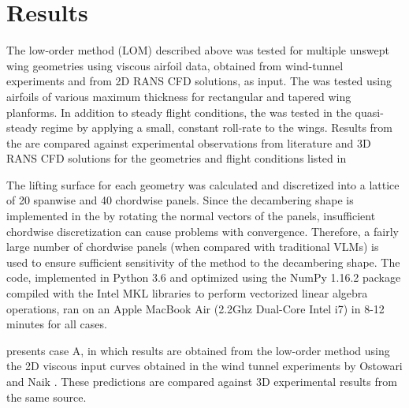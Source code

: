 \section{Results}
\label{sec:unswept-results}

The low-order method (LOM) described above was tested for multiple unswept wing geometries using viscous airfoil data, obtained from wind-tunnel experiments and from 2D RANS CFD solutions, as input. The \methodname was tested using airfoils of various maximum thickness for rectangular and tapered wing planforms. In addition to steady flight conditions, the \methodname was tested in the quasi-steady regime by applying a small, constant roll-rate to the wings. Results from the \methodabbr are compared against experimental observations from literature and 3D RANS CFD solutions for the geometries and flight conditions listed in 




{The lifting surface for each geometry was calculated and discretized into a lattice of 20 spanwise and 40 chordwise panels. Since the decambering shape is implemented in the \methodabbr by rotating the normal vectors of the panels, insufficient chordwise discretization can cause problems with convergence. Therefore, a fairly large number of chordwise panels (when compared with traditional VLMs) is used to ensure sufficient sensitivity of the method to the decambering shape. The code, implemented in Python 3.6 and optimized using the NumPy 1.16.2 package compiled with the Intel MKL libraries to perform vectorized linear algebra operations, ran on an Apple MacBook Air (2.2Ghz Dual-Core Intel i7) in 8-12 minutes for all cases.}

 presents case A, in which results are obtained from the low-order method using the 2D viscous input curves obtained in the wind tunnel experiments by  Ostowari and Naik \cite{naik_ostowari_nrel}.
These predictions are compared against 3D experimental results from the same source.

